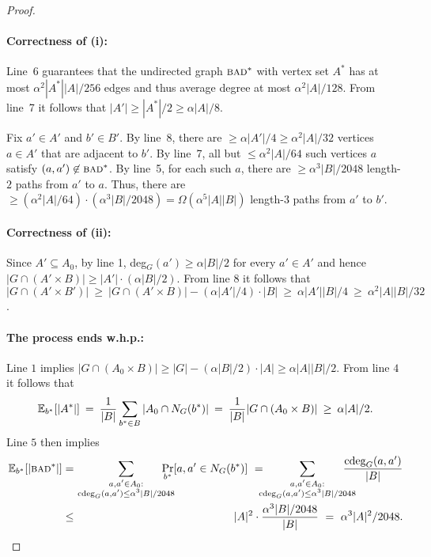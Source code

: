 \documentclass[11pt]{article}
\begin{document}
{\begin{proof}
\paragraph{Correctness of (i):}

Line~6 guarantees that the undirected graph $\textsc{bad}^*$ with vertex
set $A^*$ has
at most $\alpha^2 |A^*||A|/256$ edges and thus average degree at most
$\alpha^2 |A|/128$.
From line~7 it follows that $|A'| \geq |A^*|/2 \geq \alpha |A|/8$.

Fix $a' \in A'$ and $b' \in B'$.
By line~8, there are $\geq \alpha|A'|/4 \geq \alpha^2 |A|/32$ vertices $a \in A'$ that are
adjacent to $b'$.  By line~7, all but $\leq \alpha^2 |A|/64$ such vertices $a$ satisfy $(a,a')\not\in \textsc{bad}^*$.
By line~5, for each such $a$, there are $\geq  \alpha^3 |B|/2048$ length-$2$ paths from $a'$ to $a$.
Thus, there are $\geq (\alpha^2 |A|/64)\cdot(\alpha^3 |B|/2048) = \Omega(\alpha^5 |A||B|)$
length-$3$ paths from $a'$ to $b'$.



\paragraph{Correctness of (ii):}

Since $A' \subseteq A_0$, by line 1, deg$_G(a') \geq  \alpha |B|/2$ for every $a' \in A'$ and hence $|G\cap (A'\times B)| \geq  |A'|\cdot (\alpha |B|/2)$.
From line $8$  it follows that $|G\cap (A'\times B')| \:\geq\:  |G\cap (A'\times B)| - (\alpha |A'|/4)\cdot |B|
                          \:\geq\:  \alpha |A'||B|/4 \:\geq\:  \alpha^2 |A||B|/32$.

\paragraph{The process ends w.h.p.:}

Line $1$ implies $|G\cap (A_0\times B)| \geq |G| - (\alpha |B|/2)\cdot |A|  \geq  \alpha |A||B|/2$. From line $4$ it follows that
$$\mathbb{E}_{b^*}[|A^*|] \:=\: \frac{1}{|B|} \sum_{b^* \in B} |A_0\cap N_G(b^*)| \:=\: \frac{1}{|B|} |G\cap (A_0\times B)| \:\geq\:  \alpha |A|/2.$$
Line $5$ then implies
\begin{eqnarray*}
\Ex_{b^*}[|\BAD^*|] &=& \!\!\!\!\sum_{\substack{a,a' \in A_0:\\\cdeg_G(a,a') \leq  \alpha^3 |B|/2048}}\!\!\!\!\!\!\!\!
                \Pr_{b^*}[a,a' \in N_G(b^*)]
            \ = \!\!\!\!\sum_{\substack{a,a' \in A_0:\\ \cdeg_G(a,a') \leq  \alpha^3 |B|/2048}}\!\!\!\!\!\!\!\!
                \frac{\cdeg_G(a,a')}{|B|}\\
            &\leq&  |A|^2 \cdot \frac{\alpha^3 |B|/2048}{|B|}\ =\ \alpha^3 |A|^2/2048.
\end{eqnarray*}


\end{proof}}
\end{document}
